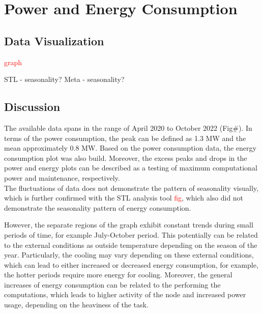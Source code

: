 \section{Power and Energy Consumption}
\noindent

\subsection{Data Visualization}
\textcolor{red}{graph}

STL - seasonality?
Meta - seasonality?


\subsection{Discussion}
The available data spans in the range of April 2020 to October 2022 (Fig\#). In terms of the power consumption, the peak can be defined as 1.3 MW and the mean approximately 0.8 MW. Based on the power consumption data, the energy consumption plot was also build. Moreover, the excess peaks and drops in the power and energy plots can be described as a testing of maximum computational power and maintenance, respectively.  \\
The fluctuations of data does not demonstrate the pattern of seasonality visually, which is further confirmed with the STL analysis tool \textcolor{red}{fig}, which also did not demonstrate the seasonality pattern of energy consumption. 

However, the separate regions of the graph exhibit constant trends during small periods of time, for example July-October period. This potentially can be related to the external conditions as outside temperature depending on the season of the year. Particularly, the cooling may vary depending on these external conditions, which can lead to either increased or decreased energy consumption, for example, the hotter periods require more energy for cooling. Moreover, the general increases of energy consumption can be related to the performing the computations, which leads to higher activity of the node and increased power usage, depending on the heaviness of the task. 

